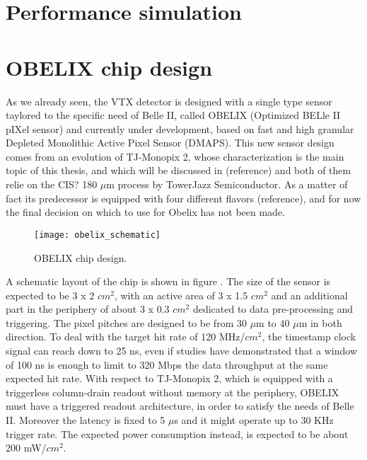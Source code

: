 \section{Performance simulation}


\section{OBELIX chip design}

As we already seen, the VTX detector is designed with a single type sensor taylored to the specific need of Belle II, called OBELIX (Optimized BELle II pIXel sensor) and currently under development, based on fast and high granular Depleted Monolithic Active Pixel Sensor (DMAPS). This new sensor design comes from an evolution of TJ-Monopix 2, whose characterization is the main topic of this thesis, and which will be discussed in (reference) and both of them relie on the CIS? 180 $\mu$m process by TowerJazz Semiconductor.
As a matter of fact its predecessor is equipped with four different flavors (reference), and for now the final decision on which to use for Obelix has not been made. \\

\begin{figure}[h!]
\centering
\texttt{[image: obelix\_schematic]}
\caption{OBELIX chip design.}
\label{fig:obelix_scheme}
\end{figure}

A schematic layout of the chip is shown in figure . The size of the sensor is expected to be 3 x 2 $cm^{2}$, with an active area of 3 x 1.5 $cm^{2}$ and an additional part in the periphery of about 3 x 0.3 $cm^{2}$ dedicated to data pre-processing and triggering. The pixel pitches are designed to be from 30 $\mu$m to 40 $\mu$m in both direction. 
To deal with the target hit rate of 120 MHz/$cm^{2}$, the timestamp clock signal can reach down to 25 ns, even if studies have demonstrated that a window of 100 ns is enough to limit to 320 Mbps the data throughput at the same expected hit rate.
With respect to TJ-Monopix 2, which is equipped with a triggerless column-drain readout without memory at the periphery, OBELIX must have a triggered readout architecture, in order to satisfy the needs of Belle II. Moreover the latency is fixed to 5 $\mu$s and it might operate up to 30 KHz trigger rate.
The expected power consumption instead, is expected to be about 200 mW/$cm^{2}$. 

